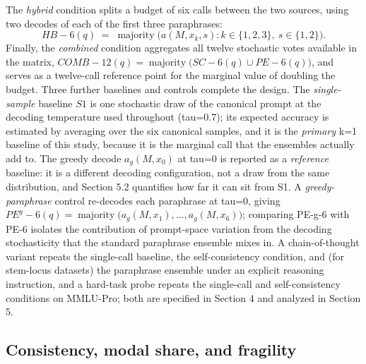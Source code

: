 \documentclass[preprint,12pt]{elsarticle}
\begin{document}
The \emph{hybrid} condition splits a budget of six calls between the two sources, using two decodes of each of the first three paraphrases:
\begin{equation}
HB-6(q) \;=\; \operatorname*{majority}\bigl( a(M, x_k, s) : k \in \{1,2,3\},\ s \in \{1,2\} \bigr).
\end{equation}
Finally, the \emph{combined} condition aggregates all twelve stochastic votes available in the matrix, $COMB-12(q) = \operatorname{majority}\bigl( SC-6(q) \cup PE-6(q) \bigr)$, and serves as a twelve-call reference point for the marginal value of doubling the budget. Three further baselines and controls complete the design. The \emph{single-sample} baseline $S1$ is one stochastic draw of the canonical prompt at the decoding temperature used throughout (tau=0.7); its expected accuracy is estimated by averaging over the six canonical samples, and it is the \emph{primary} k=1 baseline of this study, because it is the marginal call that the ensembles actually add to. The greedy decode $a_g(M, x_0)$ at tau=0 is reported as a \emph{reference} baseline: it is a different decoding configuration, not a draw from the same distribution, and Section 5.2 quantifies how far it can sit from S1. A \emph{greedy-paraphrase} control re-decodes each paraphrase at tau=0, giving $PE^{g}-6(q) = \operatorname{majority}\bigl( a_g(M, x_1), \dots, a_g(M, x_6) \bigr)$; comparing PE-g-6 with PE-6 isolates the contribution of prompt-space variation from the decoding stochasticity that the standard paraphrase ensemble mixes in. A chain-of-thought variant repeats the single-call baseline, the self-consistency condition, and (for stem-locus datasets) the paraphrase ensemble under an explicit reasoning instruction, and a hard-task probe repeats the single-call and self-consistency conditions on MMLU-Pro; both are specified in Section 4 and analyzed in Section 5.

\subsection{Consistency, modal share, and fragility}
\end{document}
